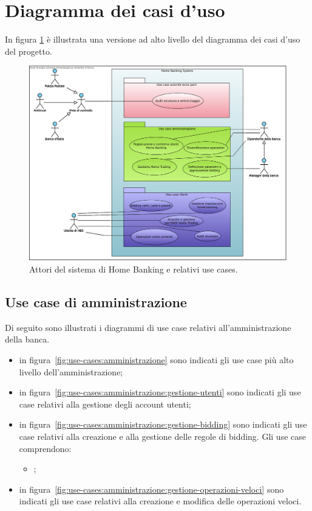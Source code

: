 \section{Diagramma dei casi d'uso}

In figura \ref{fig:use-cases} \`e illustrata una versione ad alto livello del diagramma dei casi d'uso del progetto.

\begin{figure}
	\centering
	\includegraphics[width=\textwidth]{Images/Home_Banking_inception_use_cases.eps}
	\caption{Attori del sistema di Home Banking e relativi use cases.}
	\label{fig:use-cases}
\end{figure}

\subsection{Use case di amministrazione}

Di seguito sono illustrati i diagrammi di use case relativi all'amministrazione della banca.

\begin{itemize}
	\item in figura~\ref{fig:use-cases:amministrazione} sono indicati gli use case più alto livello dell'amministrazione;

	\item in figura~\ref{fig:use-cases:amministrazione:gestione-utenti} sono indicati gli use case relativi alla gestione degli account utenti;

	\item in figura~\ref{fig:use-cases:amministrazione:gestione-bidding} sono indicati gli use case relativi alla creazione e alla gestione delle regole di bidding.
	Gli use case comprendono:
	\begin{itemize}
		\item \hyperref[sec:use-case:BIDVIS]{\idBIDVIS};
	\end{itemize}

	\item in figura~\ref{fig:use-cases:amministrazione:gestione-operazioni-veloci} sono indicati gli use case relativi alla creazione e modifica delle operazioni veloci.
\end{itemize}

